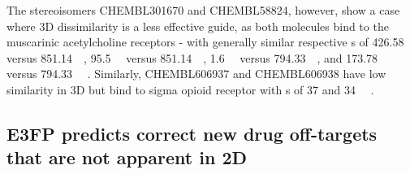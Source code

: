 \documentclass[../../main.tex]{subfiles}
\begin{document}
\begin{refsection}
	The stereoisomers CHEMBL301670 and  CHEMBL58824, however, show a case where 3D dissimilarity is a less effective guide, as both molecules bind to the muscarinic acetylcholine receptors - with generally similar respective \ICfifty s of \SI{426.58}{\nano\molar} versus \SI{851.14}{\nano\molar},  \SI{95.5}{\nano\molar} versus \SI{851.14}{\nano\molar}, \SI{1.6}{\micro\molar} versus \SI{794.33}{\nano\molar}, and \SI{173.78}{\nano\molar} versus  \SI{794.33}{\nano\molar} \supercite{gao_2002}.
	Similarly,  CHEMBL606937 and CHEMBL606938 have low similarity in 3D but bind to sigma opioid receptor with \ICfifty s of 37 and \SI{34}{\nano\molar} \supercite{decosta_1990}.

	\subsection*{E3FP predicts correct new drug off-targets that are not apparent in 2D}


\end{refsection}
\end{document}
